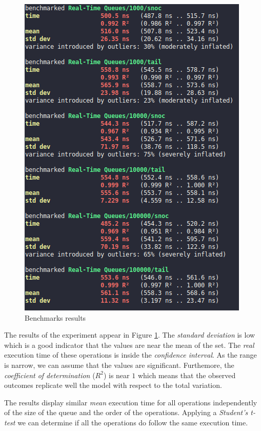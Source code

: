 \documentclass[12pt, a4paper]{article} %
\begin{document}
\begin{figure}[H]
  \centering
  \includegraphics[scale=0.7]{experiment}
  \caption{Benchmarks results}
  \label{fig:experiment results}
\end{figure}

The results of the experiment appear in Figure \ref{fig:experiment results}.
The \textit{standard deviation} is low which is a good indicator that the values are near the mean of the set.
The \textit{real} execution time of these operations is inside the \textit{confidence interval}. As the range is narrow, we can assume that the values are significant.
Furthemore, the \textit{coefficient of determination} ($R^2$) is near $1$ which means that the observed outcomes replicate well the model with respect to the total variation.

\newpage

The results display similar \textit{mean} execution time for all operations independently of the size of the queue and the order of the operations.
Applying a \textit{Student's t-test} we can determine if all the operations do follow the same execution time.
\end{document}

